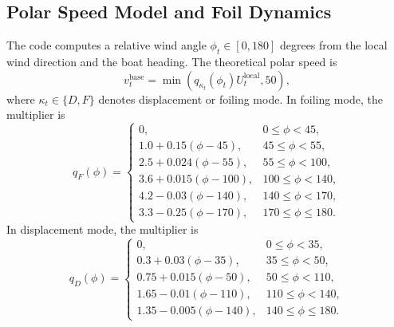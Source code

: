 \documentclass{article}
\begin{document}
\subsection{Polar Speed Model and Foil Dynamics}
The code computes a relative wind angle $\phi_t\in[0,180]$ degrees from the local wind direction and the boat heading. The theoretical polar speed is
\begin{equation}
    v^{\mathrm{base}}_t =
    \min(q_{\kappa_t}(\phi_t)U^{\mathrm{local}}_t,50),
\end{equation}
where $\kappa_t \in \{D,F\}$ denotes displacement or foiling mode. In foiling mode, the multiplier is
\begin{equation}
q_F(\phi)=
\begin{cases}
0, & 0\le \phi <45,\\
1.0+0.15(\phi-45), & 45\le \phi <55,\\
2.5+0.024(\phi-55), & 55\le \phi <100,\\
3.6+0.015(\phi-100), & 100\le \phi <140,\\
4.2-0.03(\phi-140), & 140\le \phi <170,\\
3.3-0.25(\phi-170), & 170\le \phi \le 180.
\end{cases}
\end{equation}
In displacement mode, the multiplier is
\begin{equation}
q_D(\phi)=
\begin{cases}
0, & 0\le \phi <35,\\
0.3+0.03(\phi-35), & 35\le \phi <50,\\
0.75+0.015(\phi-50), & 50\le \phi <110,\\
1.65-0.01(\phi-110), & 110\le \phi <140,\\
1.35-0.005(\phi-140), & 140\le \phi \le 180.
\end{cases}
\end{equation}
\end{document}
